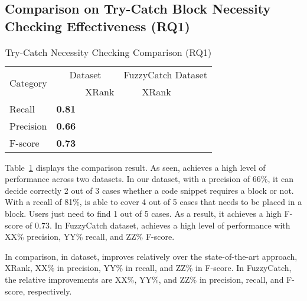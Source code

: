 \subsection{Comparison on Try-Catch Block Necessity Checking Effectiveness (RQ1)}
\label{sec:rq1}

\begin{table}[t]
  \caption{Try-Catch Necessity Checking Comparison (RQ1)}
  \vspace{-12pt}
	\begin{center}
		\renewcommand{\arraystretch}{1}
		\begin{tabular}{p{1.5cm}<{\centering}|p{1.25cm}<{\centering}p{1.25cm}<{\centering}|p{1.25cm}<{\centering}p{1.25cm}<{\centering}}
			\hline
			\multirow{2}{*}{Category} & \multicolumn{2}{c|}{{\tool} Dataset} & \multicolumn{2}{c}{FuzzyCatch Dataset}\\
			\cline{2-5}
			  & \tool  & XRank & \tool  & XRank\\
			\hline
			Recall    & \textbf{0.81} & &&\\
			Precision & \textbf{0.66} & &&\\
			F-score   & \textbf{0.73} & &&\\
			\hline
		\end{tabular}
		\label{tab:xblock}
	\end{center}
\end{table}


Table~\ref{tab:xblock} displays the comparison result. As seen,
{\tool} achieves a high level of performance across two datasets. In
our dataset, with a precision of 66\%, it can decide correctly 2 out
of 3 cases whether a code snippet requires a  block or
not. With a recall of 81\%, {\tool} is able to cover 4 out of 5 cases
that needs to be placed in a  block. Users just need
to find 1 out of 5 cases. As a result, it achieves a high F-score of
0.73. In FuzzyCatch dataset, {\tool} achieves a high level of
performance with XX\% precision, YY\% recall, and ZZ\% F-score.

In comparison, in {\tool} dataset, {\tool} improves relatively over
the state-of-the-art approach, XRank, XX\% in precision, YY\% in
recall, and ZZ\% in F-score. In FuzzyCatch, the relative improvements
are XX\%, YY\%, and ZZ\% in precision, recall, and F-score,
respectively.

